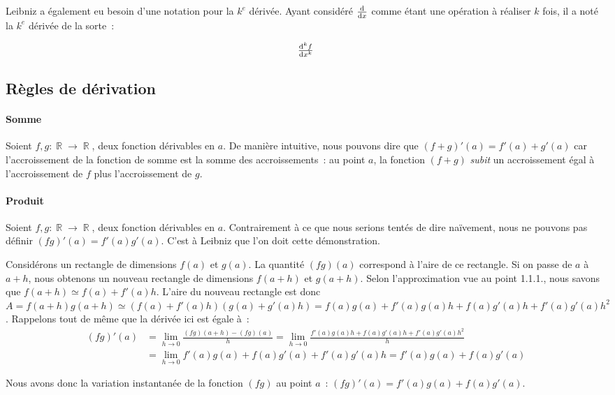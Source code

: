 \documentclass{article}
\DeclareMathOperator{\R}{\mathbb R}
\theoremstyle{definition}
\theoremstyle{remark}
\begin{document}
			Leibniz a également eu besoin d'une notation pour la $k^e$ dérivée. Ayant considéré $\frac {\dif{}}{\dif x}$ comme étant
			une opération à réaliser $k$ fois, il a noté la $k^e$ dérivée de la sorte~:

			\[\od[k] fx\]

	\subsection{Règles de dérivation}
		\paragraph{Somme}
			Soient $f, g : \R \to \R$, deux fonction dérivables en $a$. De manière intuitive, nous pouvons dire que
			$(f+g)'(a) = f'(a) + g'(a)$ car l'accroissement de la fonction de somme est la somme des accroissements~: au point $a$,
			la fonction $(f+g)$ \textit{subit} un accroissement égal à l'accroissement de $f$ plus l'accroissement de $g$.

		\paragraph{Produit}
			Soient $f, g : \R \to \R$, deux fonction dérivables en $a$. Contrairement à ce que nous serions tentés de dire
			naïvement, nous ne pouvons pas définir $(fg)'(a) = f'(a)g'(a)$. C'est à Leibniz que l'on doit cette démonstration.

			Considérons un rectangle de dimensions $f(a)$ et $g(a)$. La quantité $(fg)(a)$ correspond à l'aire de ce rectangle.
			Si on passe de $a$ à $a+h$, nous obtenons un nouveau rectangle de dimensions $f(a+h)$ et $g(a+h)$. Selon l'approximation
			vue au point 1.1.1., nous savons que $f(a+h) \simeq f(a) + f'(a)h$. L'aire du nouveau rectangle est donc $A = f(a+h)g(a+h)
			\simeq (f(a) + f'(a)h)(g(a) + g'(a)h) = f(a)g(a) + f'(a)g(a)h + f(a)g'(a)h + f'(a)g'(a)h^2$.
			Rappelons tout de même que la dérivée ici est égale à~:
			\[\begin{aligned}(fg)'(a) &= \lim_{h \to 0}\frac{(fg)(a+h) - (fg)(a)}{h} = \lim_{h \to 0}\frac {f'(a)g(a)h + f(a)g'(a)h + f'(a)g'(a)h^2}{h} \\
									  &= \lim_{h \to 0}f'(a)g(a) + f(a)g'(a) + f'(a)g'(a)h = f'(a)g(a) + f(a)g'(a)\end{aligned}\]

			Nous avons donc la variation instantanée de la fonction $(fg)$ au point $a$~: $(fg)'(a) = f'(a)g(a) + f(a)g'(a)$.
\end{document}
